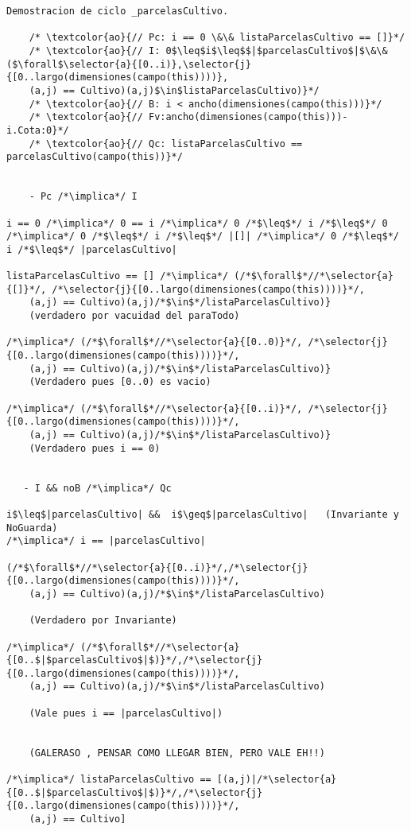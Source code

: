 \begin{lstlisting}
Demostracion de ciclo _parcelasCultivo.

    /* \textcolor{ao}{// Pc: i == 0 \&\& listaParcelasCultivo == []}*/        
    /* \textcolor{ao}{// I: 0$\leq$i$\leq$$|$parcelasCultivo$|$\&\&($\forall$\selector{a}{[0..i)},\selector{j}{[0..largo(dimensiones(campo(this))))},
    (a,j) == Cultivo)(a,j)$\in$listaParcelasCultivo)}*/
    /* \textcolor{ao}{// B: i < ancho(dimensiones(campo(this)))}*/
    /* \textcolor{ao}{// Fv:ancho(dimensiones(campo(this)))-i.Cota:0}*/
    /* \textcolor{ao}{// Qc: listaParcelasCultivo == parcelasCultivo(campo(this))}*/    


    - Pc /*\implica*/ I
    
i == 0 /*\implica*/ 0 == i /*\implica*/ 0 /*$\leq$*/ i /*$\leq$*/ 0
/*\implica*/ 0 /*$\leq$*/ i /*$\leq$*/ |[]| /*\implica*/ 0 /*$\leq$*/ i /*$\leq$*/ |parcelasCultivo|

listaParcelasCultivo == [] /*\implica*/ (/*$\forall$*//*\selector{a}{[]}*/, /*\selector{j}{[0..largo(dimensiones(campo(this))))}*/,
    (a,j) == Cultivo)(a,j)/*$\in$*/listaParcelasCultivo)}
    (verdadero por vacuidad del paraTodo)
    
/*\implica*/ (/*$\forall$*//*\selector{a}{[0..0)}*/, /*\selector{j}{[0..largo(dimensiones(campo(this))))}*/,
    (a,j) == Cultivo)(a,j)/*$\in$*/listaParcelasCultivo)}
	(Verdadero pues [0..0) es vacio)

/*\implica*/ (/*$\forall$*//*\selector{a}{[0..i)}*/, /*\selector{j}{[0..largo(dimensiones(campo(this))))}*/,
    (a,j) == Cultivo)(a,j)/*$\in$*/listaParcelasCultivo)}
    (Verdadero pues i == 0)
    

   - I && noB /*\implica*/ Qc
   
i$\leq$|parcelasCultivo| &&  i$\geq$|parcelasCultivo|   (Invariante y NoGuarda)
/*\implica*/ i == |parcelasCultivo|

(/*$\forall$*//*\selector{a}{[0..i)}*/,/*\selector{j}{[0..largo(dimensiones(campo(this))))}*/,
    (a,j) == Cultivo)(a,j)/*$\in$*/listaParcelasCultivo)
    
    (Verdadero por Invariante)
    
/*\implica*/ (/*$\forall$*//*\selector{a}{[0..$|$parcelasCultivo$|$)}*/,/*\selector{j}{[0..largo(dimensiones(campo(this))))}*/,
    (a,j) == Cultivo)(a,j)/*$\in$*/listaParcelasCultivo)
	
	(Vale pues i == |parcelasCultivo|)    


	(GALERASO , PENSAR COMO LLEGAR BIEN, PERO VALE EH!!)

/*\implica*/ listaParcelasCultivo == [(a,j)|/*\selector{a}{[0..$|$parcelasCultivo$|$)}*/,/*\selector{j}{[0..largo(dimensiones(campo(this))))}*/,
    (a,j) == Cultivo]


\end{lstlisting}
